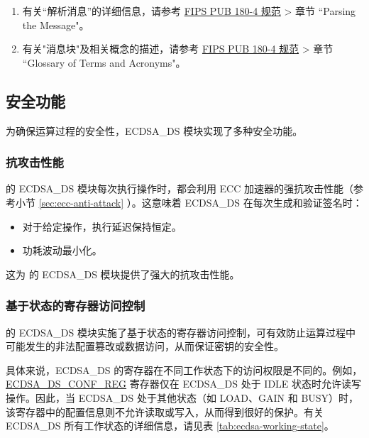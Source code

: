 \documentclass[main\_\_CN.tex]{subfiles}
\begin{document}
\begin{tiplisting}
\begin{enumerate}
\vspace{-2.5em}
    \item 有关“解析消息”的详细信息，请参考 \href{https://doi.org/10.6028/NIST.FIPS.180-4}{FIPS PUB 180-4 规范} > 章节 ``Parsing the Message"。
    \item 有关"消息块"及相关概念的描述，请参考 \href{https://doi.org/10.6028/NIST.FIPS.180-4}{FIPS PUB 180-4 规范} > 章节 ``Glossary of Terms and Acronyms"。
\end{enumerate}
\end{tiplisting}



\subsection{安全功能}
\label{sec:ecdsa-security_features}

为确保运算过程的安全性，ECDSA\_DS 模块实现了多种安全功能。

\subsubsection{抗攻击性能}

\chipseries{} 的 ECDSA\_DS 模块每次执行操作时，都会利用 ECC 加速器的强抗攻击性能（参考小节 \ref{sec:ecc-anti-attack} \textit{}）。这意味着 ECDSA\_DS 在每次生成和验证签名时：

\begin{itemize}
    \item 对于给定操作，执行延迟保持恒定。
    \item 功耗波动最小化。
\end{itemize}

这为 \chipseries{} 的 ECDSA\_DS 模块提供了强大的抗攻击性能。

\subsubsection{基于状态的寄存器访问控制}

\chipseries{} 的 ECDSA\_DS 模块实施了基于状态的寄存器访问控制，可有效防止运算过程中可能发生的非法配置篡改或数据访问，从而保证密钥的安全性。

具体来说，ECDSA\_DS 的寄存器在不同工作状态下的访问权限是不同的。例如，\hyperref[regdesc:ECDSADSCONFREG]{ECDSA\_DS\_CONF\_REG} 寄存器仅在 ECDSA\_DS 处于 IDLE 状态时允许读写操作。因此，当 ECDSA\_DS 处于其他状态（如 LOAD、GAIN 和 BUSY）时，该寄存器中的配置信息则不允许读取或写入，从而得到很好的保护。有关 ECDSA\_DS 所有工作状态的详细信息，请见表 \ref{tab:ecdsa-working-state}。
\end{document}
